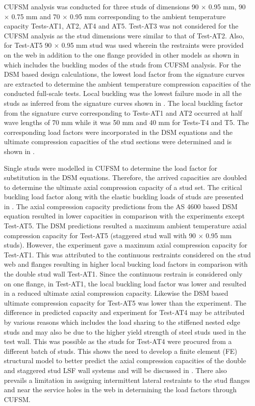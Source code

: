 CUFSM analysis was conducted for three studs of dimensions 90 $\times$ 0.95 mm, 90 $\times$ 0.75 mm and 70 $\times$ 0.95 mm corresponding to the ambient temperature capacity Tests-AT1, AT2, AT4 and AT5. Test-AT3 was not considered for the CUFSM analysis as the stud dimensions were similar to that of Test-AT2. Also, for Test-AT5 90 $\times$ 0.95 mm stud was used wherein the restraints were provided on the web in addition to the one flange provided in other models as shown in  which includes the buckling modes of the studs from CUFSM analysis. For the DSM based design calculations, the lowest load factor from the signature curves are extracted to determine the ambient temperature compression capacities of the conducted full-scale tests. Local buckling was the lowest failure mode in all the studs as inferred from the signature curves shown in . The local buckling factor from the signature curve corresponding to Tests-AT1 and AT2 occurred at half wave lengths of 70 mm while it was 50 mm and 40 mm for Tests-T4 and T5. The corresponding load factors were incorporated in the DSM equations and the ultimate compression capacities of the stud sections were determined and is shown in . 

Single studs were modelled in CUFSM to determine the load factor for substitution in the DSM equations. Therefore, the arrived capacities are doubled to determine the ultimate axial compression capacity of a stud set. The critical buckling load factor along with the elastic buckling loads of studs are presented in . The axial compression capacity predictions from the AS 4600 based DSM equation resulted in lower capacities in comparison with the experiments except Test-AT5. The DSM predictions resulted a maximum ambient temperature axial compression capacity for Test-AT5 (staggered stud wall with 90 $\times$ 0.95 mm studs). However, the experiment gave a maximum axial compression capacity for Test-AT1. This was attributed to the continuous restraints considered on the stud web and flanges resulting in higher local bucking load factors in comparison with the double stud wall Test-AT1. Since the continuous restrain is considered only on one flange, in Test-AT1, the local buckling load factor was lower and resulted in a reduced ultimate axial compression capacity. Likewise the DSM based ultimate compression capacity for Test-AT5 was lower than the experiment. The difference in predicted capacity and experiment for Test-AT4 may be attributed by various reasons which includes the load sharing to the stiffened nested edge studs and may also be due to the higher yield strength of steel studs used in the test wall. This was possible as the studs for Test-AT4 were procured from a different batch of studs. This shows the need to develop a finite element (FE) structural model to better predict the axial compression capacities of the double and staggered stud LSF wall systems and will be discussed in . There also prevails a limitation in assigning intermittent lateral restraints to the stud flanges and near the service holes in the web in determining the load factors through CUFSM.

